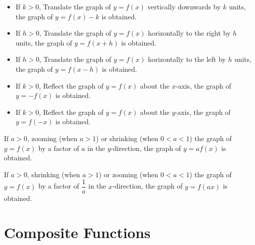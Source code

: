 \documentclass{report}
\begin{document}
\begin{multicols}{2}
\begin{mdframed}[style=MyFrame]
\begin{itemize}[leftmargin=0.3cm]
      \item If $k > 0$, Translate the graph of $y = f(x)$ vertically downwards by $k$
            units, the graph of $y = f(x) - k$ is obtained.
    \end{itemize}
  \end{mdframed}

  \begin{mdframed}[style=MyFrame]
    \begin{itemize}[leftmargin=0.3cm]
      \item If $h > 0$, Translate the graph of $y = f(x)$ horizontally to the right by $h$
            units, the graph of $y = f(x + h)$ is obtained.

      \item If $h > 0$, Translate the graph of $y = f(x)$ horizontally to the left by $h$
            units, the graph of $y = f(x - h)$ is obtained.
    \end{itemize}
  \end{mdframed}

  \begin{mdframed}[style=MyFrame]
    \begin{itemize}[leftmargin=0.3cm]
      \item If $k > 0$, Reflect the graph of $y = f(x)$ about the $x$-axis, the graph of $y
              = -f(x)$ is obtained.

      \item If $k > 0$, Reflect the graph of $y = f(x)$ about the $y$-axis, the graph of $y
              = f(-x)$ is obtained.
    \end{itemize}
  \end{mdframed}

  \begin{mdframed}[style=MyFrame]
    If $a > 0$, zooming (when $a > 1$) or shrinking (when $0 < a < 1$) the graph of $y = f(x)$ by a factor of $a$ in the $y$-direction, the graph of $y = af(x)$ is obtained.
  \end{mdframed}

  \begin{mdframed}[style=MyFrame]
    If $a > 0$, shrinking (when $a > 1$) or zooming (when $0 < a < 1$) the graph of $y = f(x)$ by a factor of $\dfrac{1}{a}$ in the $x$-direction, the graph of $y = f(ax)$ is obtained.
  \end{mdframed}

  \section{Composite Functions}


\end{multicols}
\end{document}

